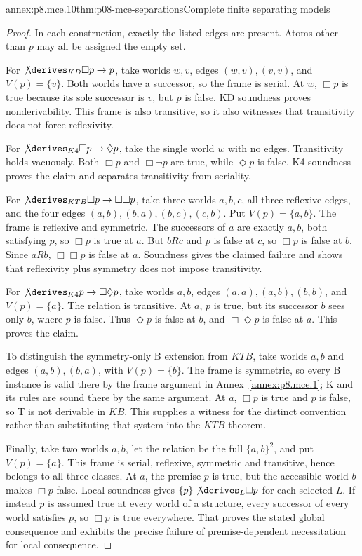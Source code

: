 \begin{annexitem}{annex:p8.mce.10}{thm:p08-mce-separations}{Complete finite separating models}
\begin{proof}
In each construction, exactly the listed edges are present. Atoms other
than \(p\) may all be assigned the empty set.

For \(\not\derives_{KD}\Box p\to p\), take worlds \(w,v\), edges
\((w,v),(v,v)\), and \(V(p)=\{v\}\). Both worlds have a successor,
so the frame is serial. At \(w\), \(\Box p\) is true because its
sole successor is \(v\), but \(p\) is false. KD soundness proves
nonderivability. This frame is also transitive, so it also witnesses that
transitivity does not force reflexivity.

For \(\not\derives_{K4}\Box p\to\Diamond p\), take the single
world \(w\) with no edges. Transitivity holds vacuously. Both
\(\Box p\) and \(\Box\neg p\) are true, while \(\Diamond p\)
is false. K4 soundness proves the claim and separates transitivity from
seriality.

For \(\not\derives_{KTB}\Box p\to\Box\Box p\), take three worlds
\(a,b,c\), all three reflexive edges, and the four edges
\((a,b),(b,a),(b,c),(c,b)\). Put \(V(p)=\{a,b\}\). The frame
is reflexive and symmetric. The successors of \(a\) are exactly
\(a,b\), both satisfying \(p\), so \(\Box p\) is true at
\(a\). But \(bRc\) and \(p\) is false at \(c\), so
\(\Box p\) is false at \(b\). Since \(aRb\),
\(\Box\Box p\) is false at \(a\). Soundness gives the claimed
failure and shows that reflexivity plus symmetry does not impose
transitivity.

For \(\not\derives_{K4}p\to\Box\Diamond p\), take worlds
\(a,b\), edges \((a,a),(a,b),(b,b)\), and \(V(p)=\{a\}\).
The relation is transitive. At \(a\), \(p\) is true, but its
successor \(b\) sees only \(b\), where \(p\) is false.
Thus \(\Diamond p\) is false at \(b\), and
\(\Box\Diamond p\) is false at \(a\). This proves the claim.

To distinguish the symmetry-only B extension from \(KTB\), take
worlds \(a,b\) and edges \((a,b),(b,a)\), with
\(V(p)=\{b\}\). The frame is symmetric, so every B instance is
valid there by the frame argument in Annex~\ref{annex:p8.mce.1}; K
and its rules are sound there by the same argument. At \(a\),
\(\Box p\) is true and \(p\) is false, so T is not derivable
in \(KB\). This supplies a witness for the distinct convention rather
than substituting that system into the \(KTB\) theorem.

Finally, take two worlds \(a,b\), let the relation be the full
\(\{a,b\}^2\), and put \(V(p)=\{a\}\). This frame is serial,
reflexive, symmetric and transitive, hence belongs to all three classes.
At \(a\), the premise \(p\) is true, but the accessible world
\(b\) makes \(\Box p\) false. Local soundness gives
\(\{p\}\not\derives_L\Box p\) for each selected \(L\).
If instead \(p\) is assumed true at every world of a structure, every
successor of every world satisfies \(p\), so \(\Box p\) is true
everywhere. That proves the stated global consequence and exhibits the
precise failure of premise-dependent necessitation for local consequence.
\end{proof}
\end{annexitem}

